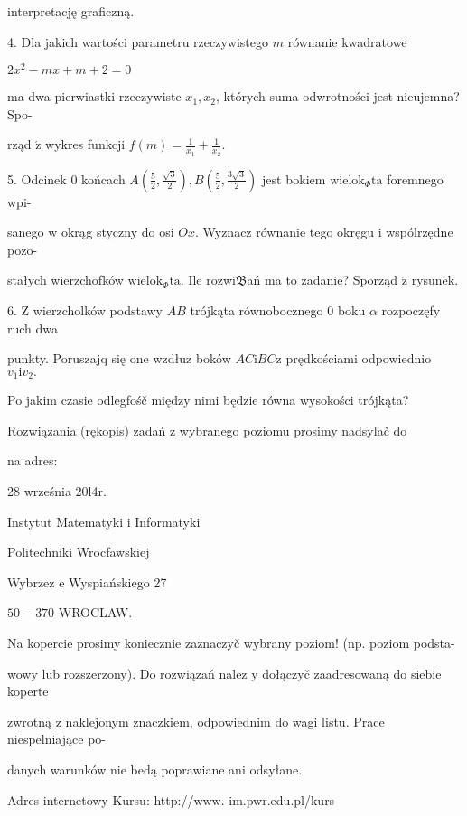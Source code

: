 \documentclass[a4paper,12pt]{article}
\begin{document}
interpretację graficzną.

4. Dla jakich wartości parametru rzeczywistego $m$ równanie kwadratowe

$2x^{2}-mx+m+2=0$

ma dwa pierwiastki rzeczywiste $x_{1}, x_{2}$, których suma odwrotności jest nieujemna? Spo-

rząd $\acute{\mathrm{z}}$ wykres funkcji $f(m)=\displaystyle \frac{1}{x_{1}}+\frac{1}{x_{2}}.$

5. Odcinek $0$ końcach $A(\displaystyle \frac{5}{2},\frac{\sqrt{3}}{2}), B(\displaystyle \frac{5}{2},\frac{3\sqrt{3}}{2})$ jest bokiem $\mathrm{w}\mathrm{i}\mathrm{e}\mathrm{l}\mathrm{o}\mathrm{k}_{\Phi}\mathrm{t}\mathrm{a}$ foremnego wpi-

sanego $\mathrm{w}$ okrąg styczny do osi $Ox$. Wyznacz równanie tego okręgu $\mathrm{i}$ wspólrzędne pozo-

stałych wierzchofków $\mathrm{w}\mathrm{i}\mathrm{e}\mathrm{l}\mathrm{o}\mathrm{k}_{\Phi}\mathrm{t}\mathrm{a}$. Ile rozwi$\mathfrak{B}$ań ma to zadanie? Sporząd $\acute{\mathrm{z}}$ rysunek.

6. $\mathrm{Z}$ wierzcholków podstawy $AB$ trójkąta równobocznego $0$ boku $\alpha$ rozpoczęfy ruch dwa

punkty. Poruszajq się one wzdłuz boków $AC\mathrm{i}BC\mathrm{z}$ prędkościami odpowiednio $v_{1}\mathrm{i}v_{2}.$

Po jakim czasie odlegfośč między nimi będzie równa wysokości trójkąta?

Rozwiązania (rękopis) zadań z wybranego poziomu prosimy nadsylač do

na adres:

28 września 20l4r.

Instytut Matematyki $\mathrm{i}$ Informatyki

Politechniki Wrocfawskiej

Wybrzez $\mathrm{e}$ Wyspiańskiego 27

$50-370$ WROCLAW.

Na kopercie prosimy koniecznie zaznaczyč wybrany poziom! (np. poziom podsta-

wowy lub rozszerzony). Do rozwiązań nalez $\mathrm{y}$ dołączyč zaadresowaną do siebie koperte

zwrotną $\mathrm{z}$ naklejonym znaczkiem, odpowiednim do wagi listu. Prace niespelniające po-

danych warunków nie bedą poprawiane ani odsyłane.

Adres internetowy Kursu: http://www. im.pwr.edu.pl/kurs
\end{document}
